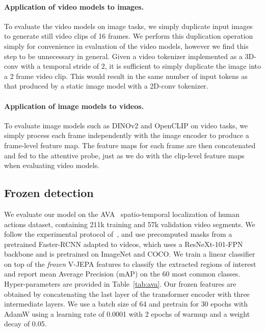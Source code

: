 \documentclass[twocolumn]{fairmeta}
\newcommand{\putalg}{{\small V-JEPA}\xspace}
\theoremstyle{plain}
\theoremstyle{definition}
\theoremstyle{remark}
\begin{document}
\paragraph{Application of video models to images.}
To evaluate the video models on image tasks, we simply duplicate input images to generate still video clips of 16 frames.
We perform this duplication operation simply for convenience in evaluation of the video models, however we find this step to be unnecessary in general.
Given a video tokenizer implemented as a 3D-conv with a temporal stride of $2$, it is sufficient to simply duplicate the image into a 2 frame video clip.
This would result in the same number of input tokens as that produced by a static image model with a 2D-conv tokenizer.

\paragraph{Application of image models to videos.}
To evaluate image models such as DINOv2 and OpenCLIP on video tasks, we simply process each frame independently with the image encoder to produce a frame-level feature map.
The feature maps for each frame are then concatenated and fed to the attentive probe, just as we do with the clip-level feature maps when evaluating video models.

\subsection{Frozen detection}

We evaluate our model on the AVA~\citep{gu2018ava} spatio-temporal localization of human actions dataset, containing 211k training and 57k validation video segments. We follow the experimental protocol of~\citep{feichtenhofer2021large}, and use precomputed masks from a pretrained Faster-RCNN adapted to videos, which uses a ResNeXt-101-FPN backbone and is pretrained on ImageNet and COCO. We train a linear classifier on top of the \textit{frozen} \putalg features to classify the extracted regions of interest and report mean Average Precision (mAP) on the 60 most common classes.
Hyper-parameters are provided in Table~\ref{tab:ava}.
Our frozen features are obtained by concatenating the last layer of the transformer encoder with three intermediate layers.
We use a batch size of 64 and pretrain for 30 epochs with AdamW using a learning rate of 0.0001 with 2 epochs of warmup and a weight decay of 0.05.
\end{document}
